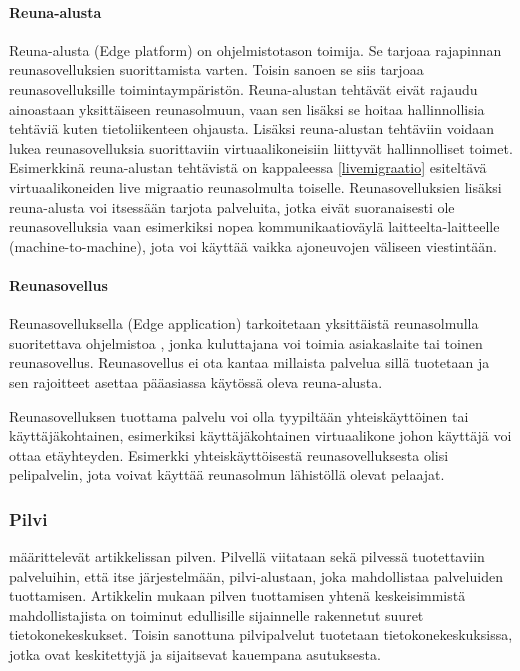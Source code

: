 \paragraph{Reuna-alusta}
Reuna-alusta (Edge platform) on ohjelmistotason toimija. Se tarjoaa rajapinnan reunasovelluksien suorittamista varten\cite{etsirefarch}. Toisin sanoen se siis tarjoaa reunasovelluksille toimintaympäristön.
Reuna-alustan tehtävät eivät rajaudu ainoastaan yksittäiseen reunasolmuun, vaan sen lisäksi se hoitaa hallinnollisia tehtäviä kuten tietoliikenteen ohjausta. Lisäksi reuna-alustan tehtäviin voidaan lukea reunasovelluksia suorittaviin virtuaalikoneisiin liittyvät hallinnolliset toimet. Esimerkkinä reuna-alustan tehtävistä on kappaleessa \ref{livemigraatio} esiteltävä virtuaalikoneiden live migraatio reunasolmulta toiselle.
Reunasovelluksien lisäksi reuna-alusta voi itsessään tarjota palveluita, jotka eivät suoranaisesti ole reunasovelluksia vaan esimerkiksi nopea kommunikaatioväylä laitteelta-laitteelle (machine-to-machine), jota voi käyttää vaikka ajoneuvojen väliseen viestintään.

\paragraph{Reunasovellus}
Reunasovelluksella (Edge application) tarkoitetaan yksittäistä reunasolmulla suoritettava ohjelmistoa \cite{etsirefarch}, jonka kuluttajana voi toimia asiakaslaite tai toinen reunasovellus. Reunasovellus ei ota kantaa millaista palvelua sillä tuotetaan ja sen rajoitteet asettaa pääasiassa käytössä oleva reuna-alusta. 

Reunasovelluksen tuottama palvelu voi olla tyypiltään yhteiskäyttöinen tai käyttäjäkohtainen, esimerkiksi käyttäjäkohtainen virtuaalikone johon käyttäjä voi ottaa etäyhteyden. Esimerkki yhteiskäyttöisestä reunasovelluksesta olisi pelipalvelin, jota voivat käyttää reunasolmun lähistöllä olevat pelaajat. 

\subsubsection{Pilvi}
\cite{armbrust2010view} määrittelevät artikkelissan pilven. 
Pilvellä viitataan sekä pilvessä tuotettaviin palveluihin, että itse järjestelmään, pilvi-alustaan, joka mahdollistaa palveluiden tuottamisen.
Artikkelin mukaan pilven tuottamisen yhtenä keskeisimmistä mahdollistajista on toiminut edullisille sijainnelle rakennetut suuret tietokonekeskukset.
Toisin sanottuna pilvipalvelut tuotetaan tietokonekeskuksissa, jotka ovat keskitettyjä ja sijaitsevat kauempana asutuksesta. 

